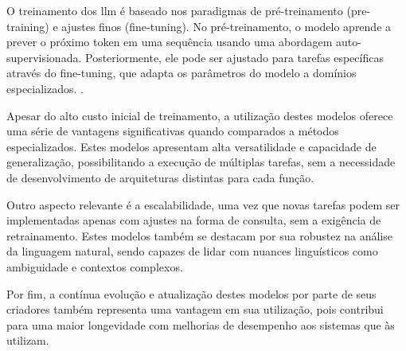 O treinamento dos \gls{llm} é baseado nos paradigmas de pré-treinamento (pre-training) e ajustes finos (fine-tuning). No pré-treinamento, o modelo aprende a prever o próximo token em uma sequência usando uma abordagem auto-supervisionada. Posteriormente, ele pode ser ajustado para tarefas específicas através do fine-tuning, que adapta os parâmetros do modelo a domínios especializados. \cite{Zhou2023}.

Apesar do alto custo inicial de treinamento, a utilização destes modelos oferece uma série de vantagens significativas quando comparados a métodos especializados. Estes modelos apresentam alta versatilidade e capacidade de generalização, possibilitando a execução de múltiplas tarefas, sem a necessidade de desenvolvimento de arquiteturas distintas para cada função.

Outro aspecto relevante é a escalabilidade, uma vez que novas tarefas podem ser implementadas apenas com ajustes na forma de consulta, sem a exigência de retrainamento. Estes modelos também se destacam por sua robustez na análise da linguagem natural, sendo capazes de lidar com nuances linguísticos como ambiguidade e contextos complexos.

Por fim, a contínua evolução e atualização destes modelos por parte de seus criadores também representa uma vantagem em sua utilização, pois contribui para uma maior longevidade com melhorias de desempenho aos sistemas que às utilizam. 